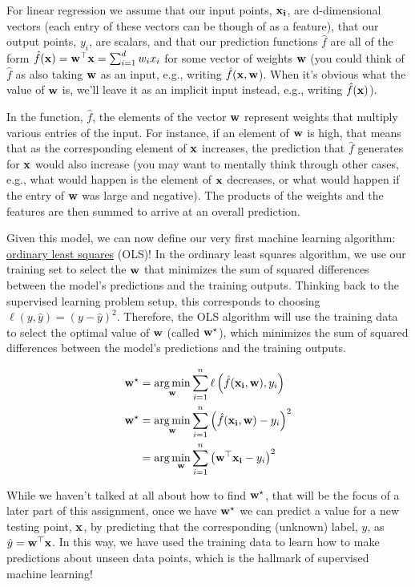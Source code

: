 \documentclass[assignment02_Solutions]{subfiles}
\begin{document}
\begin{recall}

For linear regression we assume that our input points, $\mathbf{x_i}$, are d-dimensional vectors (each entry of these vectors can be though of as a feature), that our output points, $y_i$, are scalars, and that our prediction functions $\hat{f}$ are all of the form $\hat{f}(\mathbf{x}) = \mathbf{w}^\top \mathbf{x} = \sum_{i=1}^d w_i x_i$ for some vector of weights $\mathbf{w}$ (you could think of $\hat{f}$ as also taking $\mathbf{w}$ as an input, e.g., writing $\hat{f}(\mathbf{x}, \mathbf{w}$).  When it's obvious what the value of $\mathbf{w}$ is, we'll leave it as an implicit input instead, e.g., writing $\hat{f}(\mathbf{x})$).

In the function, $\hat{f}$, the elements of the vector $\mathbf{w}$ represent weights that multiply various entries of the input.  For instance, if an element of $\mathbf{w}$ is high, that means that as the corresponding element of $\mathbf{x}$ increases, the prediction that $\hat{f}$ generates for $\mathbf{x}$ would also increase (you may want to mentally think through other cases, e.g., what would happen is the element of $\mathbf{x}$ decreases, or what would happen if the entry of $\mathbf{w}$ was large and negative).  The products of the weights and the features are then summed to arrive at an overall prediction.

Given this model, we can now define our very first machine learning algorithm: \href{https://en.wikipedia.org/wiki/Ordinary_least_squares}{ordinary least squares} (OLS)!  In the ordinary least squares algorithm, we use our training set to select the $\mathbf{w}$ that minimizes the sum of squared differences between the model's predictions and the training outputs.  Thinking back to the supervised learning problem setup, this corresponds to choosing $\ell(y, \hat{y}) = (y - \hat{y})^2$.
Therefore, the OLS algorithm will use the training data to select the optimal value of $\mathbf{w}$ (called $\mathbf{w}^\star$), which minimizes the sum of squared differences between the model's predictions and the training outputs.

\begin{align}
\mathbf{w}^\star &= \operatorname*{arg\,min}_{\mathbf{w}} \sum_{i=1}^n \ell \left ( \hat{f}(\mathbf{x_i}, \mathbf{w}) , y_i \right) \\
\mathbf{w}^\star &= \operatorname*{arg\,min}_{\mathbf{w}} \sum_{i=1}^n \left ( \hat{f}(\mathbf{x_i}, \mathbf{w}) - y_i \right)^2 \\
&= \arg\min_{\mathbf{w}} \sum_{i=1}^n \left ( \mathbf{w}^\top \mathbf{x_i} - y_i \right)^2
\end{align}

While we haven't talked at all about how to find $\mathbf{w}^\star$, that will be the focus of a later part of this assignment, once we have $\mathbf{w}^\star$ we can predict a value for a new testing point, $\mathbf{x}$, by predicting that the corresponding (unknown) label, $y$, as $\hat{y} = \mathbf{w}^\top \mathbf{x}$.  In this way, we have used the training data to learn how to make predictions about unseen data points, which is the hallmark of supervised machine learning!

\end{recall}
\end{document}
